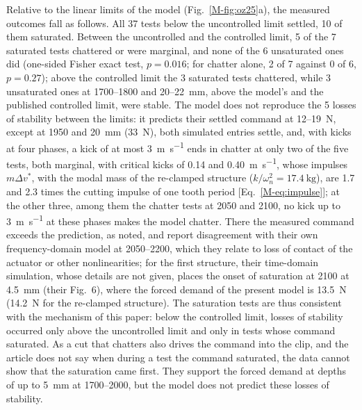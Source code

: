 Relative to the linear limits of the model (Fig.~\ref{M-fig:oz25}a), the measured outcomes fall as follows. All 37 tests below the uncontrolled limit settled, 10 of them saturated. Between the uncontrolled and the controlled limit, 5 of the 7 saturated tests chattered or were marginal, and none of the 6 unsaturated ones did (one-sided Fisher exact test, $p=0.016$; for chatter alone, 2 of 7 against 0 of 6, $p=0.27$); above the controlled limit the 3 saturated tests chattered, while 3 unsaturated ones at 1700--\SI{1800}{\rpm} and 20--\SI{22}{\milli\metre}, above the model's and the published controlled limit, were stable. The model does not reproduce the 5 losses of stability between the limits: it predicts their settled command at 12--\SI{19}{\newton}, except at \SI{1950}{\rpm} and \SI{20}{\milli\metre} (\SI{33}{\newton}), both simulated entries settle, and, with kicks at four phases, a kick of at most \SI{3}{\metre\per\second} ends in chatter at only two of the five tests, both marginal, with critical kicks of 0.14 and \SI{0.40}{\metre\per\second}, whose impulses $m\Delta v^*$, with the modal mass of the re-clamped structure ($k/\omega_n^2=\SI{17.4}{\kilogram}$), are 1.7 and 2.3 times the cutting impulse of one tooth period [Eq.~\eqref{M-eq:impulse}]; at the other three, among them the chatter tests at 2050 and \SI{2100}{\rpm}, no kick up to \SI{3}{\metre\per\second} at these phases makes the model chatter. There the measured command exceeds the prediction, as noted, and \citet{ozsoy2025frequency} report disagreement with their own frequency-domain model at 2050--\SI{2200}{\rpm}, which they relate to loss of contact of the actuator or other nonlinearities; for the first structure, their time-domain simulation, whose details are not given, places the onset of saturation at \SI{2100}{\rpm} at \SI{4.5}{\milli\metre} (their Fig.~6), where the forced demand of the present model is \SI{13.5}{\newton} (\SI{14.2}{\newton} for the re-clamped structure). The saturation tests are thus consistent with the mechanism of this paper: below the controlled limit, losses of stability occurred only above the uncontrolled limit and only in tests whose command saturated. As a cut that chatters also drives the command into the clip, and the article does not say when during a test the command saturated, the data cannot show that the saturation came first. They support the forced demand at depths of up to \SI{5}{\milli\metre} at 1700--\SI{2000}{\rpm}, but the model does not predict these losses of stability.
